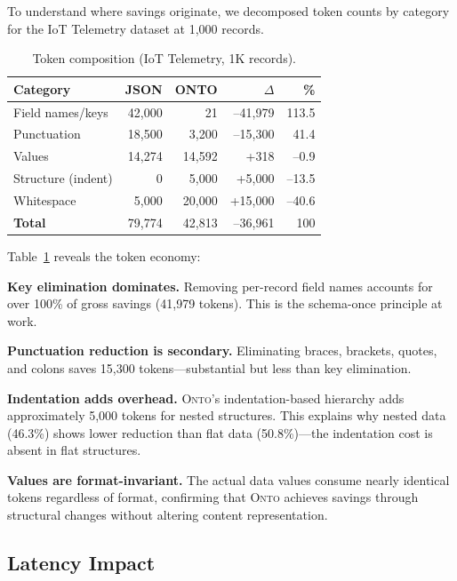 \documentclass[10pt,twocolumn]{article}
\newcommand{\onto}{\textsc{Onto}\xspace}
\begin{document}
To understand where savings originate, we decomposed token counts by category for the IoT Telemetry dataset at 1,000 records.

\begin{table}[t]
\centering
\caption{Token composition (IoT Telemetry, 1K records).}
\label{tab:composition}
\scriptsize
\begin{tabular}{lrrrr}
\toprule
\textbf{Category} & \textbf{JSON} & \textbf{ONTO} & \textbf{$\Delta$} & \textbf{\%} \\
\midrule
Field names/keys & 42,000 & 21 & --41,979 & 113.5 \\
Punctuation & 18,500 & 3,200 & --15,300 & 41.4 \\
Values & 14,274 & 14,592 & +318 & --0.9 \\
Structure (indent) & 0 & 5,000 & +5,000 & --13.5 \\
Whitespace & 5,000 & 20,000 & +15,000 & --40.6 \\
\midrule
\textbf{Total} & 79,774 & 42,813 & --36,961 & 100 \\
\bottomrule
\end{tabular}
\end{table}

Table~\ref{tab:composition} reveals the token economy:

\textbf{Key elimination dominates.} Removing per-record field names accounts for over 100\% of gross savings (41,979 tokens). This is the schema-once principle at work.

\textbf{Punctuation reduction is secondary.} Eliminating braces, brackets, quotes, and colons saves 15,300 tokens---substantial but less than key elimination.

\textbf{Indentation adds overhead.} \onto's indentation-based hierarchy adds approximately 5,000 tokens for nested structures. This explains why nested data (46.3\%) shows lower reduction than flat data (50.8\%)---the indentation cost is absent in flat structures.

\textbf{Values are format-invariant.} The actual data values consume nearly identical tokens regardless of format, confirming that \onto achieves savings through structural changes without altering content representation.

\subsection{Latency Impact}
\end{document}
